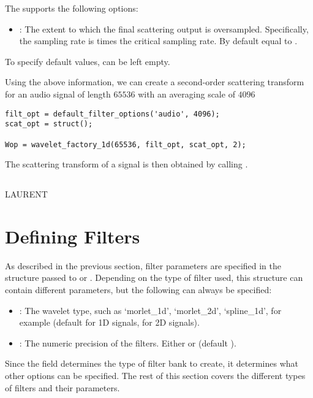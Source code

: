 \documentclass[twocolumn]{article}
\begin{document}
The  supports the following options:
\begin{itemize}
	\item {}: The extent to which the final scattering output is oversampled. Specifically, the sampling rate is  times the critical sampling rate. By default equal to .
\end{itemize}
To specify default values,  can be left empty.

Using the above information, we can create a second-order scattering transform for an audio signal of length $65536$ with an averaging scale of $4096$
\begin{lstlisting}
filt_opt = default_filter_options('audio', 4096);
scat_opt = struct();

Wop = wavelet_factory_1d(65536, filt_opt, scat_opt, 2);
\end{lstlisting}
The scattering transform of a signal  is then obtained by calling .

\subsection{}

LAURENT

\section{Defining Filters}

As described in the previous section, filter parameters are specified in the  structure passed to  or . Depending on the type of filter used, this structure can contain different parameters, but the following can always be specified:
\begin{itemize}
	\item {}: The wavelet type, such as `morlet\_1d', `morlet\_2d', `spline\_1d', for example (default  for 1D signals,  for 2D signals).
	\item {}: The numeric precision of the filters. Either  or  (default ).
\end{itemize}
Since the  field determines the type of filter bank to create, it determines what other options can be specified. The rest of this section covers the different types of filters and their parameters.
\end{document}

